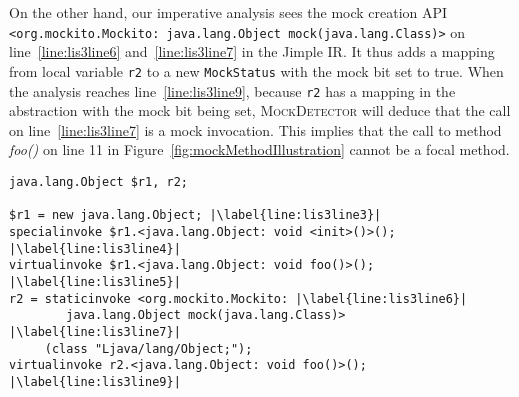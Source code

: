 On the other hand, our imperative analysis sees the mock creation API \texttt{<org.mockito.Mockito: java.lang.Object mock(java.lang.Class)>} on line~\ref{line:lis3line6} and~\ref{line:lis3line7} in the Jimple IR. It thus adds a mapping from local variable \texttt{r2} to a new \texttt{MockStatus} with the mock bit set to true. When the analysis reaches line~\ref{line:lis3line9}, because \texttt{r2} has a mapping in the abstraction with the mock bit being set, \textsc{MockDetector} will deduce that the call on line~\ref{line:lis3line7} is a mock invocation. This implies that the call to method \textit{foo()} on line 11 in Figure~\ref{fig:mockMethodIllustration} cannot be a focal method.


\begin{lstlisting}[basicstyle=\ttfamily, caption={Jimple Intermediate Representation for the code in Figure~\ref{fig:mockMethodIllustration}.},
basicstyle=\scriptsize\ttfamily, captionpos=b, label=lis:mockMethodIllustrationIR, escapechar=|, morekeywords={@Test, specialinvoke, virtualinvoke, staticinvoke}]
java.lang.Object $r1, r2;

$r1 = new java.lang.Object; |\label{line:lis3line3}|
specialinvoke $r1.<java.lang.Object: void <init>()>(); |\label{line:lis3line4}|
virtualinvoke $r1.<java.lang.Object: void foo()>(); |\label{line:lis3line5}|
r2 = staticinvoke <org.mockito.Mockito: |\label{line:lis3line6}|
        java.lang.Object mock(java.lang.Class)> |\label{line:lis3line7}|
     (class "Ljava/lang/Object;");
virtualinvoke r2.<java.lang.Object: void foo()>(); |\label{line:lis3line9}|
\end{lstlisting}

